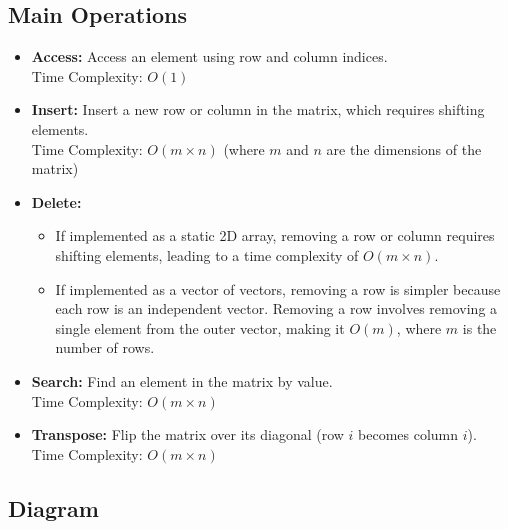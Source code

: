 \documentclass{article}
\begin{document}
\subsection{Main Operations}
\begin{itemize}
    \item \textbf{Access:} Access an element using row and column indices.\\
    Time Complexity: $O(1)$
    
    \item \textbf{Insert:} Insert a new row or column in the matrix, which requires shifting elements.\\
    Time Complexity: $O(m \times n)$ (where $m$ and $n$ are the dimensions of the matrix)
    
    \item \textbf{Delete:} 
    \begin{itemize}
        \item If implemented as a static 2D array, removing a row or column requires shifting elements, leading to a time complexity of $O(m \times n)$. 
        \item If implemented as a vector of vectors, removing a row is simpler because each row is an independent vector. Removing a row involves removing a single element from the outer vector, making it $O(m)$, where $m$ is the number of rows.
    \end{itemize}

    \item \textbf{Search:} Find an element in the matrix by value.\\
    Time Complexity: $O(m \times n)$
    
    \item \textbf{Transpose:} Flip the matrix over its diagonal (row $i$ becomes column $i$).\\
    Time Complexity: $O(m \times n)$
\end{itemize}

\subsection{Diagram}
\begin{center}
\end{center}
\end{document}
